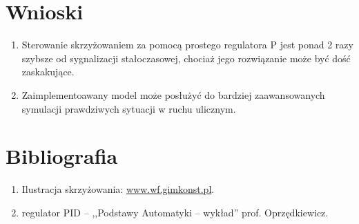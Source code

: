\documentclass[11pt]{aghdpl}
\begin{document}
\section{Wnioski}
\begin{enumerate}
	\item Sterowanie skrzyżowaniem za pomocą prostego regulatora P jest ponad 2 razy szybsze od sygnalizacji stałoczasowej, chociaż jego rozwiązanie może być dość zaskakujące.
	\item Zaimplementoawany model może posłużyć do bardziej  zaawansowanych symulacji prawdziwych sytuacji w ruchu ulicznym.
\end{enumerate}

\section{Bibliografia}
\begin{enumerate}
\item Ilustracja skrzyżowania: \href{http://www.wf.gimkonst.pl/viewpage.php?page_id=50}{ www.wf.gimkonst.pl}.
\item regulator PID -- ,,Podstawy Automatyki -- wykład'' prof. Oprzędkiewicz.

\end{enumerate}
\end{document}
